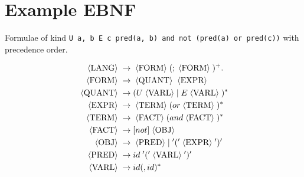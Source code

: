 \section{Example EBNF}
Formulae of kind \texttt{U a, b E c pred(a, b) and not (pred(a) or pred(c))} with precedence order.

\newcommand{\nont}[1]{\;\langle \text{#1} \rangle\;}
\begin{align*}
    \nont{LANG} &\rarr \nont{FORM} (; \nont{FORM})^+ . \\
    \nont{FORM} &\rarr \nont{QUANT} \nont{EXPR} \\
    \nont{QUANT} &\rarr (U \nont{VARL} |\; E \nont{VARL})^* \\
    \nont{EXPR} &\rarr \nont{TERM} (or \nont{TERM})^* \\
    \nont{TERM} &\rarr \nont{FACT} (and \nont{FACT})^* \\
    \nont{FACT} &\rarr [not] \nont{OBJ} \\
    \nont{OBJ} &\rarr \nont{PRED} |\; '(' \nont{EXPR} ')' \\
    \nont{PRED} &\rarr id\; '(' \nont{VARL} ')' \\
    \nont{VARL} &\rarr id (, id)^*
\end{align*}
